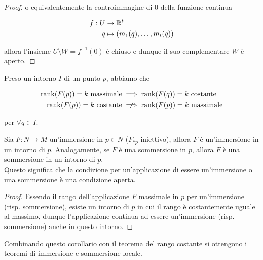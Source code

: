 \begin{proof}
	o equivalentemente la controimmagine di 0 della funzione continua
	
	\begin{align}
		\begin{split}
			f : U &\to \mathbb{R}^{t}\\
			q &\mapsto (m_{1}(q),\dots,m_{t}(q))
		\end{split}
	\end{align}

	allora l'insieme $ U \setminus W = f^{-1}(0) $ è chiuso e dunque il suo complementare $ W $ è aperto.
\end{proof}

\begin{remark}
	Preso un intorno $ I $ di un punto $ p $, abbiamo che
	
	\begin{align}
		\begin{split}
			\rank(F(p)) = k \text{ massimale} &\implies \rank(F(q)) = k \text{ costante}\\
			\rank(F(p)) = k \text{ costante} &\notimplies \rank(F(p)) = k \text{ massimale}
		\end{split}
	\end{align}

	per $ \forall q \in I $.
\end{remark}

\begin{corollary}
	Sia $ F : N \to M $ un'immersione in $ p \in N $ ($ F_{*p} $ iniettivo), allora $ F $ è un'immersione in un intorno di $ p $. Analogamente, se $ F $ è una sommersione in $ p $, allora $ F $ è una sommersione in un intorno di $ p $.\\
	Questo significa che la condizione per un'applicazione di essere un'immersione o una sommersione è una condizione aperta.
\end{corollary}

\begin{proof}
	Essendo il rango dell'applicazione $ F $ massimale in $ p $ per un'immersione (risp. sommersione), esiste un intorno di $ p $ in cui il rango è costantemente uguale al massimo, dunque l'applicazione continua ad essere un'immersione (risp. sommersione) anche in questo intorno.
\end{proof}

Combinando questo corollario con il teorema del rango costante si ottengono i teoremi di immersione e sommersione locale.

